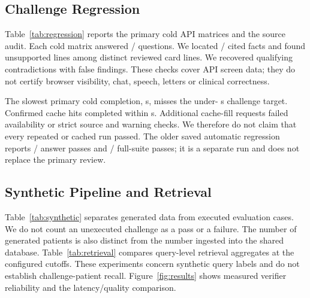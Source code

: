\documentclass[10pt]{article}
\begin{document}
\subsection{Challenge Regression}
Table~\ref{tab:regression} reports the primary cold API matrices and the source audit.
Each cold matrix answered \ReviewedAnswerPassed/\ReviewedAnswerTotal{} questions.
We located \ReviewedTraceLocated/\ReviewedTraceTotal{} cited facts and found
\ReviewedUnsupported{} unsupported lines among \ReviewedLines{} distinct reviewed
card lines. We recovered \ReviewedContradictions{} qualifying contradictions with
\ReviewedFalseAlarms{} false findings. These checks cover API screen data; they do
not certify browser visibility, chat, speech, letters or clinical correctness.
\begin{table}[!htbp]
\centering

\caption{Agent-reviewed challenge API checks. Counts retain their own denominators;
the located-fact audit also includes repeat and cached requests.}
\label{tab:regression}
\end{table}
The slowest primary cold completion, \ReviewedColdSeconds{} s, misses the
under-\ChallengeLimit{} s challenge target. Confirmed cache hits completed within
\ReviewedCachedSeconds{} s. Additional cache-fill requests failed availability or
strict source and warning checks. We therefore do not claim that every repeated or
cached run passed. The older saved automatic regression reports
\RegressionPassed/\RegressionTotal{} answer passes and
\SuitePassed/\RegressionTotal{} full-suite passes; it is a separate run and does
not replace the primary review.

\subsection{Synthetic Pipeline and Retrieval}
Table~\ref{tab:synthetic} separates generated data from executed evaluation cases.
We do not count an unexecuted challenge as a pass or a failure. The number of
generated patients is also distinct from the number ingested into the shared database.
Table~\ref{tab:retrieval} compares query-level retrieval aggregates at the configured
cutoffs. These experiments concern synthetic query labels and do not establish
challenge-patient recall. Figure~\ref{fig:results} shows measured verifier reliability and the latency/quality comparison.
\begin{table}[!htbp]
\centering

\caption{Synthetic and research artifact counts. Code-checked labels remain distinct
from human gold. An experiment can have generated cases without measured cases.}
\label{tab:synthetic}
\end{table}
\begin{table}[!htbp]
\centering

\caption{Synthetic retrieval evaluation. We omit the unmeasured vector-only mode; the identical BM25 and hybrid scores do
not establish a vector retrieval benefit.}
\label{tab:retrieval}
\end{table}
\end{document}
